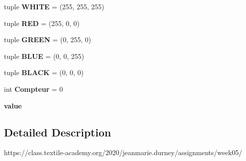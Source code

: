 \begin{DoxyCompactItemize}
tuple {\bfseries W\+H\+I\+TE} = (255, 255, 255)
\item 
\mbox{\label{namespacetouch_ae8100a7dcb27d4eb68eb50e5a5b31424}} 
tuple {\bfseries R\+ED} = (255, 0, 0)
\item 
\mbox{\label{namespacetouch_a99f20e39607df4bb827463ad5ec550a1}} 
tuple {\bfseries G\+R\+E\+EN} = (0, 255, 0)
\item 
\mbox{\label{namespacetouch_a24b0236bec37cee62cdecc916f6e123f}} 
tuple {\bfseries B\+L\+UE} = (0, 0, 255)
\item 
\mbox{\label{namespacetouch_acbd4497ab08dc6a6ef7434fb2b262b56}} 
tuple {\bfseries B\+L\+A\+CK} = (0, 0, 0)
\item 
\mbox{\label{namespacetouch_a3dafb67817e3cb73e9a7542a56861839}} 
int {\bfseries Compteur} = 0
\item 
\mbox{\label{namespacetouch_a1c7985d92be785b79cfca836bcc1ae92}} 
{\bfseries value}
\end{DoxyCompactItemize}


\subsection{Detailed Description}
\begin{DoxyVerb}https://class.textile-academy.org/2020/jeanmarie.durney/assignments/week05/
\end{DoxyVerb}
 